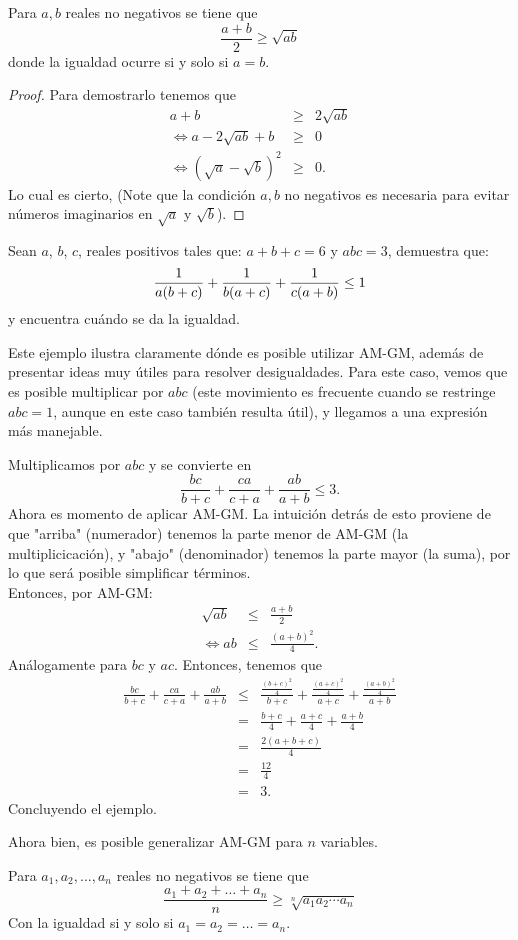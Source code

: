 \documentclass[11pt]{scrartcl}
\begin{document}
\begin{theorem} 
Para $a,b$ reales no negativos se tiene que 
$$\frac{a+b}{2} \geq \sqrt{ab}$$
donde la igualdad ocurre si y solo si $a=b$.
\end{theorem}
\begin{proof}
Para demostrarlo tenemos que 
\begin{eqnarray*}
a+b &\geq& 2\sqrt{ab} \\
\Leftrightarrow a-2\sqrt{ab}+b &\geq& 0 \\
\Leftrightarrow (\sqrt{a}-\sqrt{b})^2 &\geq& 0.
\end{eqnarray*}
Lo cual es cierto, (Note que la condici\'on $a,b$ no negativos es necesaria para evitar n\'umeros imaginarios en $\sqrt{a}$ y $\sqrt{b}$).
\end{proof}
\begin{example}
Sean \(a\), \(b\), \(c\), reales positivos tales que: \(a+b+c=6\) y \(abc=3\), demuestra que:
$${1 \over a(b+c)}  + {1 \over b(a+c)} + {1 \over c(a+b)} \leq 1$$
y encuentra cuándo se da la igualdad.
\label{BCTST2015-5}
\end{example}
Este ejemplo ilustra claramente d\'onde es posible utilizar AM-GM, además de presentar ideas muy \'utiles para resolver desigualdades. Para este caso, vemos que es posible multiplicar por $abc$ (este movimiento es frecuente cuando se restringe $abc=1$, aunque en este caso tambi\'en resulta \'util), y llegamos a una expresi\'on m\'as manejable.
\begin{soln}
Multiplicamos por $abc$ y se convierte en 
$$\frac{bc}{b+c}+\frac{ca}{c+a}+\frac{ab}{a+b} \leq 3.$$
Ahora es momento de aplicar AM-GM. La intuici\'on detr\'as de esto proviene de que "arriba" (numerador) tenemos la parte menor de AM-GM (la multiplicicaci\'on), y "abajo" (denominador) tenemos la parte mayor (la suma), por lo que ser\'a posible simplificar t\'erminos.\\

\noindent
Entonces, por AM-GM:
\begin{eqnarray*}
\sqrt{ab} &\leq& \frac{a+b}{2} \\
\Leftrightarrow ab &\leq& \frac{(a+b)^2}{4}.
\end{eqnarray*}
An\'alogamente para $bc$ y $ac$. Entonces, tenemos que 
\begin{eqnarray*}
\frac{bc}{b+c}+\frac{ca}{c+a}+\frac{ab}{a+b} &\leq& \frac{\frac{(b+c)^2}{4}}{b+c}+\frac{\frac{(a+c)^2}{4}}{a+c}+\frac{\frac{(a+b)^2}{4}}{a+b} \\
&=& \frac{b+c}{4}+\frac{a+c}{4}+\frac{a+b}{4} \\
&=& \frac{2(a+b+c)}{4} \\
&=& \frac{12}{4} \\
&=& 3.
\end{eqnarray*}
Concluyendo el ejemplo.
\end{soln}
\noindent
Ahora bien, es posible generalizar AM-GM para $n$ variables. 
\begin{theorem} [AM-GM]
Para $a_1,a_2, \ldots, a_n$ reales no negativos se tiene que 
$$\frac{a_1+a_2+\ldots+a_n}{n} \geq \sqrt[n]{a_1a_2\cdots a_n}$$
Con la igualdad si y solo si $a_1=a_2=\ldots=a_n$.
\end{theorem}
\end{document}
